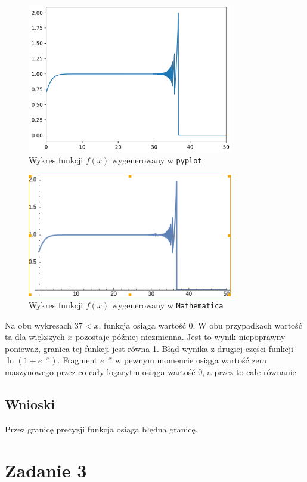 \documentclass{article}
\begin{document}
\begin{figure}[H]
    \centering
    \includegraphics[width=0.8\textwidth, trim = 0 0 0 0, clip]{img/zad2_1.png}
    \caption{Wykres funkcji $f(x)$ wygenerowany w \texttt{pyplot}}
\end{figure}
\begin{figure}[H]
    \centering
    \includegraphics[width=0.8\textwidth, trim = 0 0 0 0, clip]{img/zad2_3.png}
    \caption{Wykres funkcji $f(x)$ wygenerowany w \texttt{Mathematica}}
\end{figure}

Na obu wykresach $37<x$, funkcja  osiąga wartość 0. W obu przypadkach wartość ta dla większych $x$ pozostaje później niezmienna. Jest to wynik niepoprawny ponieważ, granica tej funkcji jest równa 1. Błąd wynika z drugiej części funkcji $\ln (1+e^{-x})$. Fragment $e^{-x}$ w pewnym momencie osiąga wartość zera maszynowego przez co cały logarytm osiąga wartość 0, a przez to całe równanie.  
\subsection*{Wnioski}
Przez granicę precyzji funkcja osiąga błędną granicę.
\section*{Zadanie 3}
\end{document}
